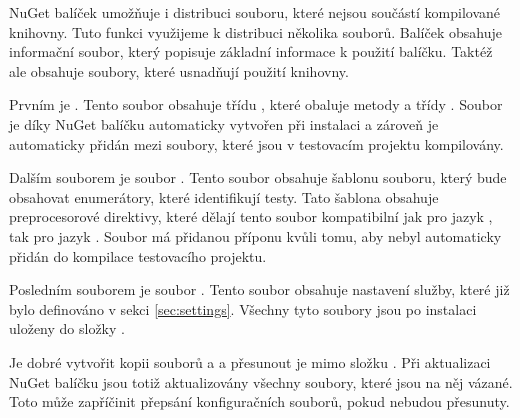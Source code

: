 NuGet balíček umožňuje i distribuci souboru, které nejsou součástí kompilované knihovny. Tuto funkci využijeme k distribuci několika souborů. Balíček obsahuje informační soubor, který popisuje základní informace k použití balíčku. Taktéž ale obsahuje soubory, které usnadňují použití knihovny. 

Prvním je . Tento soubor obsahuje třídu , které obaluje metody  a  třídy . Soubor je díky NuGet balíčku automaticky vytvořen při instalaci a zároveň je automaticky přidán mezi soubory, které jsou v testovacím projektu kompilovány. 

Dalším souborem je soubor . Tento soubor obsahuje šablonu souboru, který bude obsahovat enumerátory, které identifikují testy. Tato šablona obsahuje preprocesorové direktivy, které dělají tento soubor kompatibilní jak pro jazyk \csharp{}, tak pro jazyk \cpp{}. Soubor má přidanou příponu  kvůli tomu, aby nebyl automaticky přidán do kompilace testovacího projektu.

Posledním souborem je soubor . Tento soubor obsahuje nastavení služby, které již bylo definováno v sekci \ref{sec:settings}. Všechny tyto soubory jsou po instalaci uloženy do složky .

Je dobré vytvořit kopii souborů  a  a přesunout je mimo složku . Při aktualizaci NuGet balíčku jsou totiž aktualizovány všechny soubory, které jsou na něj vázané. Toto může zapříčinit přepsání konfiguračních souborů, pokud nebudou přesunuty. 

